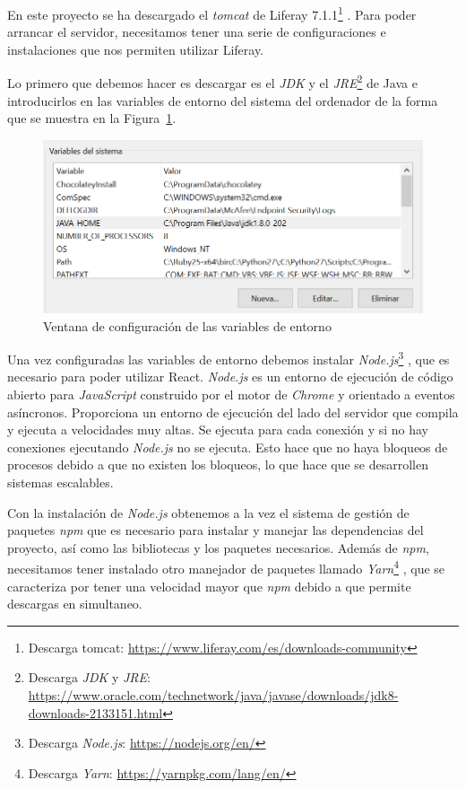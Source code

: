 \documentclass[a4paper, 12pt]{book}
\begin{document}
En este proyecto se ha descargado el \textit{tomcat} de Liferay 7.1.1\footnote{Descarga tomcat: \url{https://www.liferay.com/es/downloads-community}} . Para poder arrancar el servidor, necesitamos tener una serie de configuraciones e instalaciones que nos permiten utilizar Liferay.

\vspace{5mm}
Lo primero que debemos hacer es descargar es el \textit{JDK} y el \textit{JRE}\footnote{Descarga \textit{JDK} y \textit{JRE}: \url{https://www.oracle.com/technetwork/java/javase/downloads/jdk8-downloads-2133151.html}}  de Java e introducirlos en las variables de entorno del sistema del ordenador de la forma que se muestra en la Figura~\ref{fig:variables-entorno}.
\begin{figure}
  \centering
  \includegraphics{img_usadas/variablesentornos.png}
  \caption{Ventana de configuración de las variables de entorno}
  \label{fig:variables-entorno}
\end{figure}

\vspace{5mm}
Una vez configuradas las variables de entorno debemos instalar \textit{Node.js}\footnote{Descarga \textit{Node.js}: \url{https://nodejs.org/en/}} , que es necesario para poder utilizar React. \textit{Node.js} es un entorno de ejecución de código abierto para \textit{JavaScript} construido por el motor de \textit{Chrome} y orientado a eventos asíncronos. Proporciona un entorno de ejecución del lado del servidor que compila y ejecuta a velocidades muy altas. Se ejecuta para cada conexión y si no hay conexiones ejecutando \textit{Node.js} no se ejecuta. Esto hace que no haya bloqueos de procesos debido a que no existen los bloqueos, lo que hace que se desarrollen sistemas escalables.

\vspace{5mm}
Con la instalación de \textit{Node.js} obtenemos a la vez el sistema de gestión de paquetes \textit{npm} que es necesario para instalar y manejar las dependencias del proyecto, así como las bibliotecas y los paquetes necesarios. Además de \textit{npm}, necesitamos tener instalado otro manejador de paquetes llamado \textit{Yarn}\footnote{Descarga \textit{Yarn}: \url{https://yarnpkg.com/lang/en/}} , que se caracteriza por tener una velocidad mayor que \textit{npm} debido a que permite descargas en simultaneo.
\end{document}
